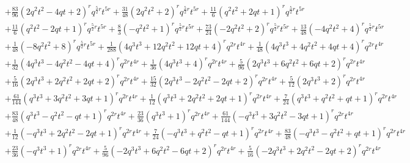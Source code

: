 \documentclass[11pt,english]{amsart}
\numberwithin{equation}{section}
\numberwithin{figure}{section}
\theoremstyle{plain}
\theoremstyle{plain}
\theoremstyle{definition}
\theoremstyle{remark}
\begin{document}
{\begin{align*}
& + \frac{83}{96} {\left(2 q^{2} t^{2} - 4 q t + 2\right)}^{r} q^{\frac{5}{2} r}t^{5r} + \frac{31}{48} {\left(2 q^{2} t^{2} + 2\right)}^{r} q^{\frac{5}{2} r}t^{5r} + \frac{11}{6} {\left(q^{2} t^{2} + 2 q t + 1\right)}^{r} q^{\frac{5}{2} r}t^{5r} \\
& + \frac{11}{6} {\left(q^{2} t^{2} - 2 q t + 1\right)}^{r} q^{\frac{5}{2} r}t^{5r} + \frac{8}{3} {\left(-q^{2} t^{2} + 1\right)}^{r} q^{\frac{5}{2} r}t^{5r} + \frac{73}{24} {\left(-2 q^{2} t^{2} + 2\right)}^{r} q^{\frac{5}{2} r}t^{5r} + \frac{13}{48} {\left(-4 q^{2} t^{2} + 4\right)}^{r} q^{\frac{5}{2} r}t^{5r} \\
& + \frac{1}{48} {\left(-8 q^{2} t^{2} + 8\right)}^{r} q^{\frac{5}{2} r}t^{5r} + \frac{1}{288} {\left(4 q^{3} t^{3} + 12 q^{2} t^{2} + 12 q t + 4\right)}^{r} q^{2r} t^{4r} + \frac{1}{48} {\left(4 q^{3} t^{3} + 4 q^{2} t^{2} + 4 q t + 4\right)}^{r} q^{2r} t^{4r} \\
& + \frac{1}{32} {\left(4 q^{3} t^{3} - 4 q^{2} t^{2} - 4 q t + 4\right)}^{r} q^{2r} t^{4r} + \frac{1}{36} {\left(4 q^{3} t^{3} + 4\right)}^{r} q^{2r} t^{4r} + \frac{5}{96} {\left(2 q^{3} t^{3} + 6 q^{2} t^{2} + 6 q t + 2\right)}^{r} q^{2r} t^{4r} \\
& + \frac{5}{16} {\left(2 q^{3} t^{3} + 2 q^{2} t^{2} + 2 q t + 2\right)}^{r} q^{2r} t^{4r} + \frac{15}{32} {\left(2 q^{3} t^{3} - 2 q^{2} t^{2} - 2 q t + 2\right)}^{r} q^{2r} t^{4r} + \frac{5}{12} {\left(2 q^{3} t^{3} + 2\right)}^{r} q^{2r} t^{4r} \\
& + \frac{61}{144} {\left(q^{3} t^{3} + 3 q^{2} t^{2} + 3 q t + 1\right)}^{r} q^{2r} t^{4r} + \frac{1}{12} {\left(q^{3} t^{3} + 2 q^{2} t^{2} + 2 q t + 1\right)}^{r} q^{2r} t^{4r} + \frac{7}{24} {\left(q^{3} t^{3} + q^{2} t^{2} + q t + 1\right)}^{r} q^{2r} t^{4r} \\
& + \frac{83}{48} {\left(q^{3} t^{3} - q^{2} t^{2} - q t + 1\right)}^{r} q^{2r} t^{4r} + \frac{23}{36} {\left(q^{3} t^{3} + 1\right)}^{r} q^{2r} t^{4r} + \frac{61}{144} {\left(-q^{3} t^{3} + 3 q^{2} t^{2} - 3 q t + 1\right)}^{r} q^{2r} t^{4r} \\
& + \frac{1}{12} {\left(-q^{3} t^{3} + 2 q^{2} t^{2} - 2 q t + 1\right)}^{r} q^{2r} t^{4r} + \frac{7}{24} {\left(-q^{3} t^{3} + q^{2} t^{2} - q t + 1\right)}^{r} q^{2r} t^{4r} + \frac{83}{48} {\left(-q^{3} t^{3} - q^{2} t^{2} + q t + 1\right)}^{r} q^{2r} t^{4r} \\
& + \frac{23}{36} {\left(-q^{3} t^{3} + 1\right)}^{r} q^{2r} t^{4r} + \frac{5}{96} {\left(-2 q^{3} t^{3} + 6 q^{2} t^{2} - 6 q t + 2\right)}^{r} q^{2r} t^{4r} + \frac{5}{16} {\left(-2 q^{3} t^{3} + 2 q^{2} t^{2} - 2 q t + 2\right)}^{r} q^{2r} t^{4r} \\

\end{align*}}
\end{document}
